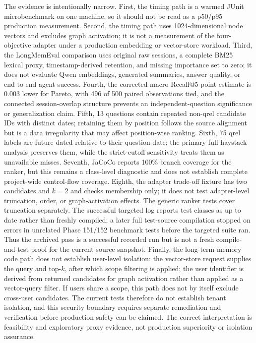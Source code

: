 \documentclass[review,12pt]{elsarticle}
\begin{document}
The evidence is intentionally narrow. First, the timing path is a warmed JUnit microbenchmark on one machine, so it should not be read as a p50/p95 production measurement. Second, the timing path uses 1024-dimensional node vectors and excludes graph activation; it is not a measurement of the four-objective adapter under a production embedding or vector-store workload. Third, the LongMemEval comparison uses original raw sessions, a complete BM25 lexical proxy, timestamp-derived retention, and missing importance set to zero; it does not evaluate Qwen embeddings, generated summaries, answer quality, or end-to-end agent success. Fourth, the corrected macro Recall@5 point estimate is 0.003 lower for Pareto, with 496 of 500 paired observations tied, and the connected session-overlap structure prevents an independent-question significance or generalization claim. Fifth, 13 questions contain repeated non-qrel candidate IDs with distinct dates; retaining them by position follows the source alignment but is a data irregularity that may affect position-wise ranking. Sixth, 75 qrel labels are future-dated relative to their question date; the primary full-haystack analysis preserves them, while the strict-cutoff sensitivity treats them as unavailable misses. Seventh, JaCoCo reports 100\% branch coverage for the ranker, but this remains a class-level diagnostic and does not establish complete project-wide control-flow coverage. Eighth, the adapter trade-off fixture has two candidates and $k=2$ and checks membership only; it does not test adapter-level truncation, order, or graph-activation effects. The generic ranker tests cover truncation separately. The successful targeted log reports test classes as up to date rather than freshly compiled; a later full test-source compilation stopped on errors in unrelated Phase 151/152 benchmark tests before the targeted suite ran. Thus the archived pass is a successful recorded run but is not a fresh compile-and-test proof for the current source snapshot. Finally, the long-term-memory code path does not establish user-level isolation: the vector-store request supplies the query and top-$k$, after which scope filtering is applied; the user identifier is derived from returned candidates for graph activation rather than applied as a vector-query filter. If users share a scope, this path does not by itself exclude cross-user candidates. The current tests therefore do not establish tenant isolation, and this security boundary requires separate remediation and verification before production safety can be claimed. The correct interpretation is feasibility and exploratory proxy evidence, not production superiority or isolation assurance.
\end{document}
